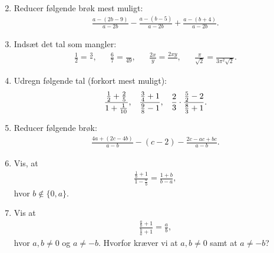 \begin{enumerate}
\begin{align*}
\end{align*}
\item Reducer følgende brøk mest muligt:
\begin{align*}
\frac{a-(2b-9)}{a-2b}-\frac{a-(b-5)}{a-2b}+\frac{a-(b+4)}{a-2b}.
\end{align*}
\item Indsæt det tal som mangler:
\begin{align*}
\frac{1}{2}= \frac{3}{},&& \frac{6}{7}=\frac{}{49},&& \frac{2x}{y}=\frac{2xy}{},&& \frac{ \pi}{\sqrt{2}}=\frac{}{3 \pi^2 \sqrt{2}}.
\end{align*}
\item Udregn følgende tal (forkort mest muligt):
\begin{align*}
\frac{ \frac{1}{2}+\frac{2}{5}}{1+\frac{1}{10}},&& \frac{ \frac{3}{4}+1}{ \frac{9}{8}-1},&& \frac{2}{3}\cdot \frac{ \frac{5}{2}-2}{ \frac{8}{3}+1}.
\end{align*}
\item Reducer følgende brøk:
\begin{align*}
\frac{4a+(2c-4b)}{a-b} - (c-2)-\frac{2c-ac+bc}{a-b}.
\end{align*}
\item Vis, at
\begin{align*}
\frac{ \frac{1}{b}+1 }{1- \frac{a}{b}}=\frac{1+b}{b-a},
\end{align*}
hvor $b\notin \{0,a\}$.
\item Vis at
\begin{align*}
\frac{ \frac{a}{b}+1}{ \frac{b}{a}+1}=\frac{a}{b},
\end{align*}
hvor $a,b\neq 0$ og $a\neq -b$. Hvorfor kræver vi at $a,b\neq 0$ samt at $a\neq -b$?
\end{enumerate}
